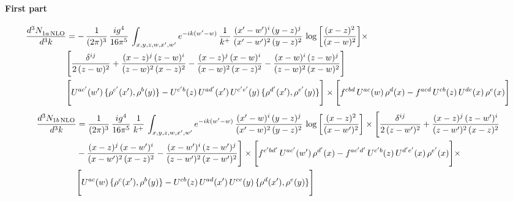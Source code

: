 \documentclass[9pt]{article}
\numberwithin{equation}{section}
\begin{document}
\paragraph{First part}
\begin{align}
 \frac{d^{3}N_{1a\,\rm NLO}^{\rm}}{d^{3}k}  & = -\,\frac{1}{(2\pi)^{3}}\,\frac{ig^{4}}{16\pi^{5}}\,\int_{x,y,z,w,x',w^{\prime}} e^{-ik(w^{\prime}-w)}\,\frac{1}{k^{+}}\, \frac{(x'-w')^{i}\,(y-z)^{j}}{(x'-w')^{2}\,(y-z)^{2}}\,\log{\left[\frac{(x-z)^{2}}{(x-w)^{2}}\right]}\times\notag \\ &  \Bigg[\frac{\delta^{ij}}{2\,(z-w)^{2}}+\frac{(x-z)^{j}\,(z-w)^{i}}{(z-w)^{2}\,(x-z)^{2}}-\frac{(x-z)^{j}\,(x-w)^{i}}{(x-w)^{2}\,(x-z)^{2}}-\frac{(x-w)^{i}\,(z-w)^{j}}{(z-w)^{2}\,(x-w)^{2}}\Bigg] \notag \\ & \Bigg[U^{ac'}(w')\,\{\rho^{c'}(x'),\rho^{b}(y)\}-U^{c'b}(z)\,U^{ad'}(x')\,U^{c'e'}(y)\, \{\rho^{d'}(x'),\rho^{e'}(y)\}\Bigg]\times \Bigg[f^{cbd}\,U^{ac}(w)\,\rho^{d}(x)-f^{acd}\, U^{cb}(z)\,U^{de}(x)\,\rho^{e}(x)\Bigg]
\end{align}
\begin{align}
\frac{d^{3}N_{1b\, \rm NLO}}{d^{3}k} & =  \frac{1}{(2\pi)^{3}}\,\frac{ig^{4}}{16\pi^{5}}\,\frac{1}{k^{+}}\,\int_{x,y,z,w,x',w^{\prime}} e^{-ik(w^{\prime}-w)}\,  \frac{(x'-w)^{i}\,(y-z)^{j}}{(x'-w)^{2}\,(y-z)^{2}}\,\log{\left[\frac{(x-z)^{2}}{(x-w')^{2}}\right]}\times \Bigg[\frac{\delta^{ij}}{2\,(z-w')^{2}}+\frac{(x-z)^{j}\,(z-w')^{i}}{(z-w')^{2}\,(x-z)^{2}}\notag \\ &  -\frac{(x-z)^{j}\,(x-w')^{i}}{(x-w')^{2}\,(x-z)^{2}} -\frac{(x-w')^{i}\,(z-w')^{j}}{(z-w')^{2}\,(x-w')^{2}}\Bigg] \times\Bigg[f^{c'bd'}\,U^{ac'}(w')\,\rho^{d'}(x)-f^{ac'd'}\, U^{c'b}(z)\,U^{d'e'}(x)\,\rho^{e'}(x)\Bigg] \times\notag \\ &  \Bigg[U^{ac}(w)\,\{\rho^{c}(x'),\rho^{b}(y)\}-U^{cb}(z)\,U^{ad}(x')\,U^{ce}(y)\, \{\rho^{d}(x'),\rho^{e}(y)\}\Bigg]
\end{align}
\end{document}
